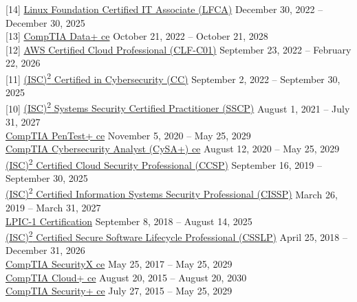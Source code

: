 \documentclass[10pt]{res} %
\begin{document}
\begin{resume}
{[14]} \phantom{0}\href{https://www.credly.com/badges/a6ac54a5-e4f8-4cc0-890d-d6b9d9db91ec}{\color{blue}Linux Foundation Certified IT Associate (LFCA)} \hfill December 30, 2022 -- December 30, 2025 \\
{[13]} \phantom{0}\href{https://www.credly.com/badges/2c7cc733-d140-43a4-9af8-57fe8c034256}{\color{blue}CompTIA Data+ ce} \hfill October 21, 2022 -- October 21, 2028 \\
{[12]} \phantom{0}\href{https://www.credly.com/badges/3b7772bf-dca2-4f69-89a5-af68770801c4}{\color{blue}AWS Certified Cloud Professional (CLF-C01)} \hfill September 23, 2022 -- February 22, 2026 \\
{[11]} \phantom{0}\href{https://www.credly.com/badges/a1b9a8ce-5f44-4651-8a07-74c7bf14974a}{\color{blue}(ISC)\textsuperscript{2} Certified in Cybersecurity (CC)} \hfill September 2, 2022 -- September 30, 2025 \\
{[10]} \phantom{0}\href{https://www.credly.com/badges/f38d9d1a-cbe0-4bad-8a1a-80b7e8199ac2}{\color{blue}(ISC)\textsuperscript{2} Systems Security Certified Practitioner (SSCP)} \hfill August 1, 2021 -- July 31, 2027 \\
\phantom{0}{[9]} \phantom{0}\href{https://www.credly.com/badges/5568361d-8296-43a1-8164-dce710c9d791}{\color{blue}CompTIA PenTest+ ce} \hfill November 5, 2020 -- May 25, 2029 \\
\phantom{0}{[8]} \phantom{0}\href{https://www.credly.com/badges/3bc4e7d8-ad38-4850-acf5-8028f4a984f5}{\color{blue}CompTIA Cybersecurity Analyst (CySA+) ce} \hfill August 12, 2020 -- May 25, 2029 \\
\phantom{0}{[7]} \phantom{0}\href{https://www.credly.com/badges/1aea9afc-3b50-4934-baa8-0afa267c24ac}{\color{blue}(ISC)\textsuperscript{2} Certified Cloud Security Professional (CCSP)} \hfill September 16, 2019 -- September 30, 2025 \\
\phantom{0}{[6]} \phantom{0}\href{https://www.credly.com/badges/a197d559-b4d3-425d-9fb6-3d0dd611debc}{\color{blue}(ISC)\textsuperscript{2} Certified Information Systems Security Professional (CISSP)} \hfill March 26, 2019 -- March 31, 2027 \\
\phantom{0}{[5]} \phantom{0}\href{https://www.credly.com/badges/155d7ff6-2e98-410f-8134-730a0b38674d}{\color{blue}LPIC-1 Certification} \hfill September 8, 2018 -- August 14, 2025 \\
\phantom{0}{[4]} \phantom{0}\href{https://www.credly.com/badges/24dec06b-c9ef-43e6-9343-cfe1cbbac036}{\color{blue}(ISC)\textsuperscript{2} Certified Secure Software Lifecycle Professional (CSSLP)} \hfill April 25, 2018 -- December 31, 2026 \\
\phantom{0}{[3]} \phantom{0}\href{https://www.credly.com/badges/01404bf0-64cb-4c4c-8aa1-aef958788830}{\color{blue}CompTIA SecurityX ce} \hfill May 25, 2017 -- May 25, 2029 \\
\phantom{0}{[2]} \phantom{0}\href{https://www.credly.com/badges/42b1aebd-f444-4d74-a66c-01802e731d07}{\color{blue}CompTIA Cloud+ ce} \hfill August 20, 2015 -- August 20, 2030 \\
\phantom{0}{[1]} \phantom{0}\href{https://www.credly.com/badges/590462f4-efdc-43dc-967f-08e9253f425a}{\color{blue}CompTIA Security+ ce} \hfill July 27, 2015 -- May 25, 2029


\end{resume}
\end{document}
